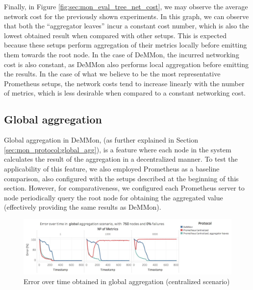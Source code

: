 Finally, in Figure \ref{fig:sec:mon_eval_tree_net_cost}, we may observe the average network cost for the previously shown experiments. In this graph, we can observe that both the ``aggregator leaves'' incur a constant cost number, which is also the lowest obtained result when compared with other setups. This is expected because these setups perform aggregation of their metrics locally before emitting them towards the root node. In the case of DeMMon, the incurred networking cost is also constant, as DeMMon also performs local aggregation before emitting the results. In the case of what we believe to be the most representative Prometheus setups, the network costs tend to increase linearly with the number of metrics, which is less desirable when compared to a constant networking cost.

\subsection{Global aggregation}

Global aggregation in DeMMon, (as further explained in Section \ref{sec:mon_protocol:global_agg}), is a feature where each node in the system calculates the result of the aggregation in a decentralized manner. To test the applicability of this feature, we also employed Prometheus as a baseline comparison, also configured with the setups described at the beginning of this section. However, for comparativeness, we configured each Prometheus server to node periodically query the root node for obtaining the aggregated value (effectively providing the same results as DeMMon).

\begin{figure}
    \centering
    \includegraphics[width=\linewidth]{Chapters/evaluation/figures/aggregation/Error_over_time_global_0_failures_centralized.jpg}
    \caption{Error over time obtained in global aggregation (centralized scenario)}
    \label{fig:sec:mon_eval_global_centralized}
\end{figure}

